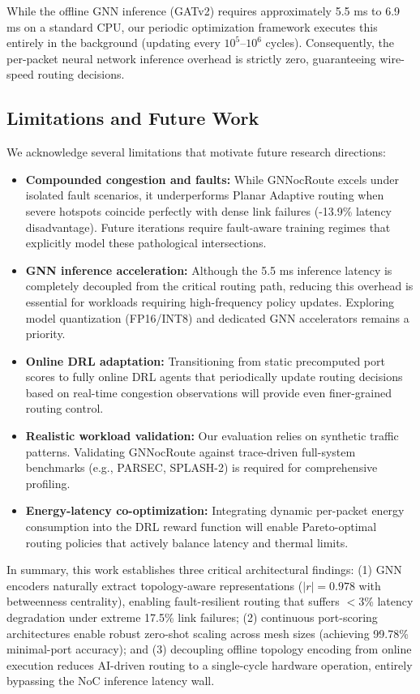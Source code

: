 While the offline GNN inference (GATv2) requires approximately 5.5 ms to 6.9 ms on a standard CPU, our periodic optimization framework executes this entirely in the background (updating every $10^5$--$10^6$ cycles). Consequently, the per-packet neural network inference overhead is strictly zero, guaranteeing wire-speed routing decisions.

\subsection{Limitations and Future Work}

We acknowledge several limitations that motivate future research directions:

\begin{itemize}
    \item \textbf{Compounded congestion and faults:} While GNNocRoute excels under isolated fault scenarios, it underperforms Planar Adaptive routing when severe hotspots coincide perfectly with dense link failures (-13.9\% latency disadvantage). Future iterations require fault-aware training regimes that explicitly model these pathological intersections.
    \item \textbf{GNN inference acceleration:} Although the 5.5 ms inference latency is completely decoupled from the critical routing path, reducing this overhead is essential for workloads requiring high-frequency policy updates. Exploring model quantization (FP16/INT8) and dedicated GNN accelerators remains a priority.
    \item \textbf{Online DRL adaptation:} Transitioning from static precomputed port scores to fully online DRL agents that periodically update routing decisions based on real-time congestion observations will provide even finer-grained routing control.
    \item \textbf{Realistic workload validation:} Our evaluation relies on synthetic traffic patterns. Validating GNNocRoute against trace-driven full-system benchmarks (e.g., PARSEC, SPLASH-2) is required for comprehensive profiling.
    \item \textbf{Energy-latency co-optimization:} Integrating dynamic per-packet energy consumption into the DRL reward function will enable Pareto-optimal routing policies that actively balance latency and thermal limits.
\end{itemize}

In summary, this work establishes three critical architectural findings: (1) GNN encoders naturally extract topology-aware representations ($|r|=0.978$ with betweenness centrality), enabling fault-resilient routing that suffers $<$3\% latency degradation under extreme 17.5\% link failures; (2) continuous port-scoring architectures enable robust zero-shot scaling across mesh sizes (achieving 99.78\% minimal-port accuracy); and (3) decoupling offline topology encoding from online execution reduces AI-driven routing to a single-cycle hardware operation, entirely bypassing the NoC inference latency wall.
